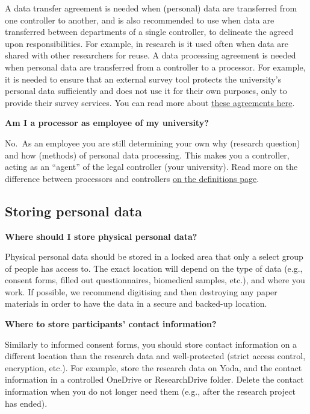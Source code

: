 \documentclass[
]{book}
\begin{document}
A data transfer agreement is needed when (personal) data are transferred from one controller to another, and is also recommended to use when data are transferred between departments of a single controller, to delineate the agreed upon responsibilities. For example, in research is it used often when data are shared with other researchers for reuse. A data processing agreement is needed when personal data are transferred from a controller to a processor. For example, it is needed to ensure that an external survey tool protects the university's personal data sufficiently and does not use it for their own purposes, only to provide their survey services. You can read more about \protect\hyperlink{agreements}{these agreements here}.

\textbf{Am I a processor as employee of my university?}

No.~As an employee you are still determining your own why (research question) and how (methods) of personal data processing. This makes you a controller, acting as an ``agent'' of the legal controller (your university). Read more on the difference between processors and controllers \protect\hyperlink{definitions}{on the definitions page}.

\hypertarget{storage}{%
\subsection{Storing personal data}\label{storage}}

\textbf{Where should I store physical personal data?}

Physical personal data should be stored in a locked area that only a select group of people has access to. The exact location will depend on the type of data (e.g., consent forms, filled out questionnaires, biomedical samples, etc.), and where you work. If possible, we recommend digitising and then destroying any paper materials in order to have the data in a secure and backed-up location.

\textbf{Where to store participants' contact information?}

Similarly to informed consent forms, you should store contact information on a different location than the research data and well-protected (strict access control, encryption, etc.). For example, store the research data on Yoda, and the contact information in a controlled OneDrive or ResearchDrive folder. Delete the contact information when you do not longer need them (e.g., after the research project has ended).
\end{document}
